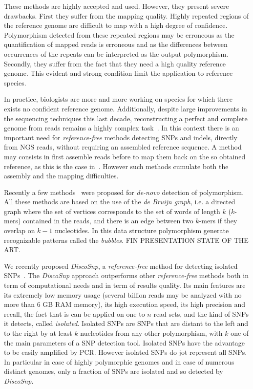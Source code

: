 \documentclass{bmcart}
\newcommand{\disco}{{\it DiscoSnp}\xspace}
\begin{document}
These methods are highly accepted and used. However, they present severe drawbacks. First they suffer from the mapping quality. Highly repeated regions of the reference genome are difficult to map with a high degree of confidence.  Polymorphism detected from these repeated regions may be erroneous as the quantification of mapped reads is erroneous and as the differences between occurrences of the repeats can be interpreted as the output polymorphism. Secondly, they suffer from the fact that they need a high quality reference genome. This evident and strong condition limit the application to reference species. 

In practice, biologists are more and more working on species for which there exists no confident reference genome. Additionally, despite large improvements in the sequencing techniques this last decade, reconstructing a perfect and complete genome from reads remains a highly complex task~\cite{}. In this context there is an important need for \emph{reference-free} methods detecting SNPs and indels, directly from NGS reads, without requiring an assembled reference sequence. A method may consists in first assemble reads before to map them back on the so obtained reference, as this is the case in~\cite{Willing2011}. However such methods cumulate both the assembly and the mapping difficulties.

Recently a few methods~\cite{8-12 de disco} were proposed for \emph{de-novo} detection of polymorphism.  All these methods are based on the use of the \emph{de Bruijn graph}, i.e. a directed graph where the set of vertices corresponds to the set of words of length $k$ ($k$-mers) contained in the reads, and there is an edge between two $k$-mers if they overlap on $k-1$ nucleotides. In this data structure polymorphism generate recognizable patterns called the \emph{bubbles}. FIN PRESENTATION STATE OF THE ART. 

We recently proposed \disco, a \emph{reference-free} method for detecting isolated SNPs~\cite{Uricaru2014a}. The \disco approach outperforms other \emph{reference-free} methods both in term of computational needs and in term of results quality. Its main features are its extremely low memory usage (several billion reads may be analyzed with no more than 6 GB RAM memory), its high execution speed, its high precision and recall, the fact that is can be applied on one to $n$ read sets, and the kind of SNPs it detects, called \emph{isolated}. Isolated SNPs are SNPs that are distant to the left and to the right by at least $k$ nucleotides from any other polymorphism, with $k$ one of the main parameters of a SNP detection tool. Isolated SNPs have the advantage to be easily amplified by PCR. However isolated SNPs do jot represent all SNPs. In particular in case of highly polymorphic genomes and in case of numerous distinct genomes, only a fraction of SNPs are isolated and so detected by \disco.
\end{document}
